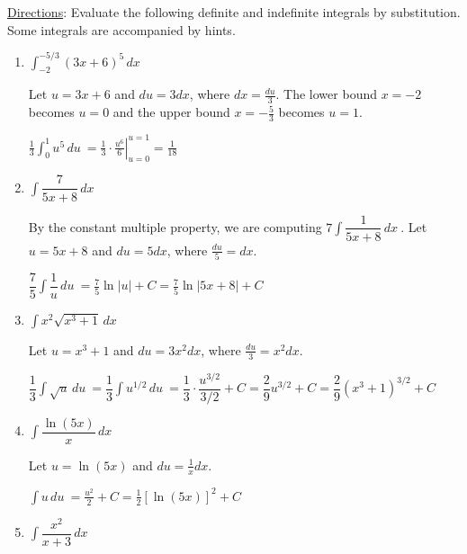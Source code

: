 \documentclass{article}
\begin{document}
\pspace{\newpage}
\vspace{-10pt}
\underline{Directions}: Evaluate the following definite and indefinite integrals by substitution. Some integrals are accompanied by hints.
\begin{enumerate}
\item $\displaystyle \int_{-2}^{-5/3} (3x+6)^5\,dx\ $

\begin{solution}
    Let $u=3x+6$ and $du=3dx$, where $dx=\frac{du}{3}$. The lower bound $x=-2$ becomes $u=0$ and the upper bound $x=-\frac{5}{3}$ becomes $u=1$.

    $\displaystyle \frac{1}{3}\int_{0}^{1} u^5\,du\ = \left. \frac{1}{3}\cdot\frac{u^6}{6}\right|_{u=0}^{u=1}=\frac{1}{18}$
    
    
\end{solution}
\pspace{\vfill}
\item $\displaystyle \int \dfrac{7}{5x+8}\,dx\ $

\begin{solution}
By the constant multiple property, we are computing $7\displaystyle \int \dfrac{1}{5x+8}\,dx\ $. Let $u=5x+8$ and $du=5dx$, where $\frac{du}{5}=dx$. 

$\dfrac{7}{5}\displaystyle \int \dfrac{1}{u}\,du\ = \frac{7}{5}\ln|u| + C = \frac{7}{5}\ln|5x+8| + C$
\end{solution}
\pspace{\vfill}
\item $\displaystyle \int x^2\sqrt{x^3+1}\,dx\ $

\begin{solution}
    Let $u=x^3+1$ and $du=3x^2dx$, where $\frac{du}{3}=x^2dx$.

    $\dfrac{1}{3}\displaystyle \int \sqrt{u}\,du\ = \dfrac{1}{3}\displaystyle \int u^{1/2}\,du\ = \dfrac{1}{3}\cdot\dfrac{u^{3/2}}{3/2}+C=\dfrac{2}{9}u^{3/2}+C=\dfrac{2}{9}(x^3+1)^{3/2}+C$
\end{solution}
\pspace{\vfill}
\item $\displaystyle \int \dfrac{\ln (5x)}{x}\,dx\ $

\begin{solution}
    Let $u=\ln (5x)$ and $du=\frac{1}{x}dx$.

    $\displaystyle \int u\,du\ = \frac{u^2}{2}+C=\frac{1}{2}[\ln(5x)]^2+C$
\end{solution}
\pspace{\vfill}

\item $\displaystyle \int \dfrac{x^2}{x+3}\,dx\ $


\end{enumerate}
\end{document}
